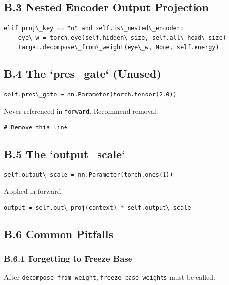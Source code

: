 \subsection{B.3 Nested Encoder Output Projection}

\begin{lstlisting}
elif proj\_key == "o" and self.is\_nested\_encoder:
    eye\_w = torch.eye(self.hidden\_size, self.all\_head\_size)
    target.decompose\_from\_weight(eye\_w, None, self.energy)
\end{lstlisting}

\subsection{B.4 The `pres\_gate` (Unused)}

\begin{lstlisting}
self.pres\_gate = nn.Parameter(torch.tensor(2.0))
\end{lstlisting}

Never referenced in \texttt{forward}. Recommend removal:

\begin{lstlisting}
# Remove this line
\end{lstlisting}

\subsection{B.5 The `output\_scale`}

\begin{lstlisting}
self.output\_scale = nn.Parameter(torch.ones(1))
\end{lstlisting}

Applied in forward:

\begin{lstlisting}
output = self.out\_proj(context) * self.output\_scale
\end{lstlisting}

\subsection{B.6 Common Pitfalls}

\subsubsection{B.6.1 Forgetting to Freeze Base}

After \texttt{decompose\_from\_weight}, \texttt{freeze\_base\_weights} must be called.

